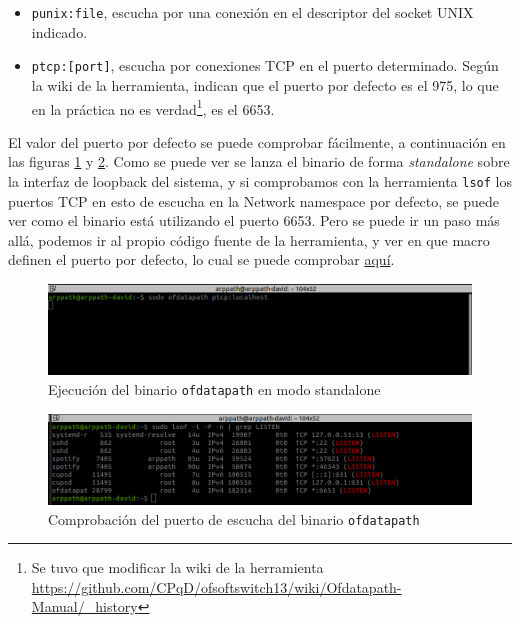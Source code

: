 \begin{itemize}
    \item \texttt{punix:file}, escucha por una conexión en el descriptor del socket UNIX indicado.

    \item \texttt{ptcp:[port]}, escucha por conexiones TCP en el puerto determinado. Según la wiki de la herramienta, indican que el puerto por defecto es el 975, lo que en la práctica no es verdad\footnote{Se tuvo que modificar la wiki de la herramienta \url{https://github.com/CPqD/ofsoftswitch13/wiki/Ofdatapath-Manual/_history}}, es el 6653.
\end{itemize}

El valor del puerto por defecto se puede comprobar fácilmente, a continuación en las figuras \ref{fig:ofdata_1} y \ref{fig:ofdata_2}. Como se puede ver se lanza el binario de forma \textit{standalone} sobre la interfaz de loopback del sistema, y si comprobamos con la herramienta \texttt{lsof} los puertos TCP en esto de escucha en la Network namespace por defecto, se puede ver como el binario está utilizando el puerto 6653. Pero se puede ir un paso más allá, podemos ir al propio código fuente de la herramienta, y ver en que macro definen el puerto por defecto, lo cual se puede comprobar \href{https://github.com/CPqD/ofsoftswitch13/blob/master/include/openflow/openflow.h#LL75C1-L75C27}{aquí}.

\begin{figure}[ht]
    \centering
    \includegraphics[width=\textwidth]{archivos/img/analisis/ofdata_1.png}
    \caption{Ejecución del binario \texttt{ofdatapath} en modo standalone}
    \label{fig:ofdata_1}
\end{figure}

\begin{figure}[ht]
    \centering
    \includegraphics[width=\textwidth]{archivos/img/analisis/ofdata_2.png}
    \caption{Comprobación del puerto de  escucha del binario \texttt{ofdatapath}}
    \label{fig:ofdata_2}
\end{figure}


